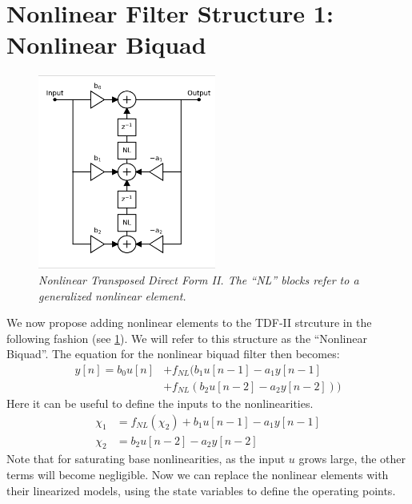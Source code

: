 \documentclass[twoside,a4paper]{article}
\begin{document}
\section{Nonlinear Filter Structure 1: Nonlinear Biquad}
%
\begin{figure}[ht]
    \center
    \includegraphics[width=2.3in]{../Pics/NL-TDF-II-White.png}
    \caption{\label{NL-TDF-II}{\it Nonlinear Transposed Direct Form II.
                                The ``NL'' blocks refer to a generalized
                                nonlinear element.}}
\end{figure}
%
We now propose adding nonlinear elements to the TDF-II strcuture in the
following fashion (see \cref{NL-TDF-II}). We will refer to this structure
as the ``Nonlinear Biquad''.
%
The equation for the nonlinear biquad filter then becomes:
%
\begin{equation}
\begin{split}
    y[n] = b_0 u[n]
         &+ f_{NL} (b_1 u[n-1] - a_1 y[n-1] \\
         &+ f_{NL} (b_2 u[n-2] - a_2 y[n-2]))
\end{split}
    \label{eq:bq_NL}
\end{equation}
%
Here it can be useful to define the inputs to the
nonlinearities.
%
\begin{equation}
\begin{split}
    \chi_1 &= f_{NL} (\chi_2) + b_1 u[n-1] - a_1 y[n-1] \\
    \chi_2 &= b_2 u[n-2] - a_2 y[n-2]
\end{split}
    \label{eq:states}
\end{equation}
%
Note that for saturating base nonlinearities, as the input $u$ grows large,
the other terms will become negligible.
\newline\newline
Now we can replace the nonlinear elements with their linearized
models, using the state variables to define the operating points.
\end{document}
